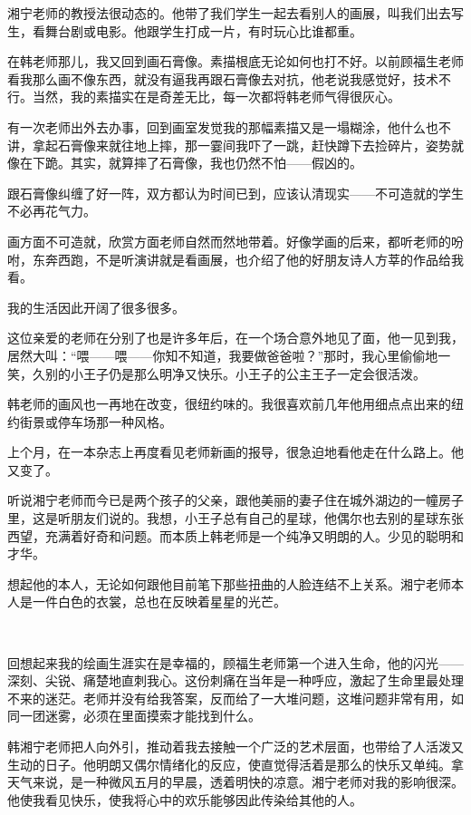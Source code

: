 \par 湘宁老师的教授法很动态的。他带了我们学生一起去看别人的画展，叫我们出去写生，看舞台剧或电影。他跟学生打成一片，有时玩心比谁都重。
\par 在韩老师那儿，我又回到画石膏像。素描根底无论如何也打不好。以前顾福生老师看我那么画不像东西，就没有逼我再跟石膏像去对抗，他老说我感觉好，技术不行。当然，我的素描实在是奇差无比，每一次都将韩老师气得很灰心。
\par 有一次老师出外去办事，回到画室发觉我的那幅素描又是一塌糊涂，他什么也不讲，拿起石膏像来就往地上摔，那一霎间我吓了一跳，赶快蹲下去捡碎片，姿势就像在下跪。其实，就算摔了石膏像，我也仍然不怕——假凶的。
\par 跟石膏像纠缠了好一阵，双方都认为时间已到，应该认清现实——不可造就的学生不必再花气力。
\par 画方面不可造就，欣赏方面老师自然而然地带着。好像学画的后来，都听老师的吩咐，东奔西跑，不是听演讲就是看画展，也介绍了他的好朋友诗人方莘的作品给我看。
\par 我的生活因此开阔了很多很多。
\par 这位亲爱的老师在分别了也是许多年后，在一个场合意外地见了面，他一见到我，居然大叫：“喂——喂——你知不知道，我要做爸爸啦？”那时，我心里偷偷地一笑，久别的小王子仍是那么明净又快乐。小王子的公主王子一定会很活泼。
\par 韩老师的画风也一再地在改变，很纽约味的。我很喜欢前几年他用细点点出来的纽约街景或停车场那一种风格。
\par 上个月，在一本杂志上再度看见老师新画的报导，很急迫地看他走在什么路上。他又变了。
\par 听说湘宁老师而今已是两个孩子的父亲，跟他美丽的妻子住在城外湖边的一幢房子里，这是听朋友们说的。我想，小王子总有自己的星球，他偶尔也去别的星球东张西望，充满着好奇和问题。而本质上韩老师是一个纯净又明朗的人。少见的聪明和才华。
\par 想起他的本人，无论如何跟他目前笔下那些扭曲的人脸连结不上关系。湘宁老师本人是一件白色的衣裳，总也在反映着星星的光芒。
\par  
\par 回想起来我的绘画生涯实在是幸福的，顾福生老师第一个进入生命，他的闪光——深刻、尖锐、痛楚地直刺我心。这份刺痛在当年是一种呼应，激起了生命里最处理不来的迷茫。老师并没有给我答案，反而给了一大堆问题，这堆问题非常有用，如同一团迷雾，必须在里面摸索才能找到什么。
\par 韩湘宁老师把人向外引，推动着我去接触一个广泛的艺术层面，也带给了人活泼又生动的日子。他明朗又偶尔情绪化的反应，使直觉得活着是那么的快乐又单纯。拿天气来说，是一种微风五月的早晨，透着明快的凉意。湘宁老师对我的影响很深。他使我看见快乐，使我将心中的欢乐能够因此传染给其他的人。
